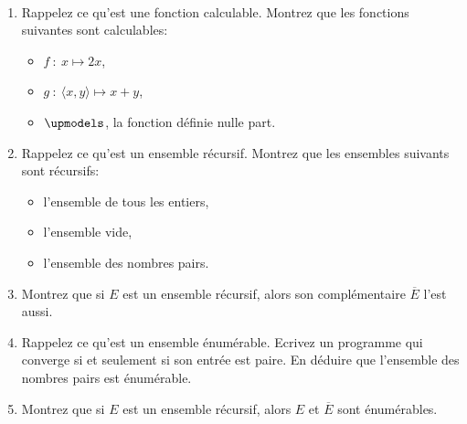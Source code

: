 \begin{td-exo}\ %
	\begin{enumerate}
		\item Rappelez ce qu'est une fonction calculable.
		Montrez que les fonctions suivantes sont calculables:
		\begin{itemize}
			\item \(f\ \colon\ x\mapsto 2x\),
			\item \(g\ \colon\ \langle x,y\rangle\mapsto x+y\),
			\item \(\upmodels\), la fonction définie nulle part.
		\end{itemize}

		\item Rappelez ce qu'est un ensemble récursif.
		Montrez que les ensembles suivants sont récursifs:
		\begin{itemize}
			\item l'ensemble de tous les entiers,
			\item l'ensemble vide,
			\item l'ensemble des nombres pairs.
		\end{itemize}

		\item Montrez que si \(E\) est un ensemble récursif, alors son complémentaire \(\overline{E}\) l'est aussi.

		\item Rappelez ce qu'est un ensemble énumérable. Ecrivez un programme qui converge 
		si et seulement si son entrée est paire. En déduire que l'ensemble des nombres pairs est énumérable.

		\item Montrez que si \(E\) est un ensemble récursif, alors \(E\) et \(\overline{E}\) sont énumérables.
	\end{enumerate}
\end{td-exo}


